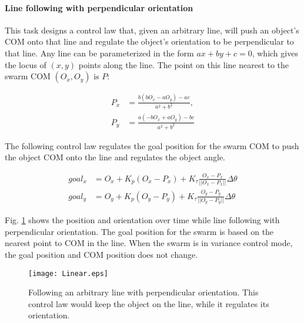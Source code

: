 \paragraph{Line following with perpendicular orientation} \label{para:PureTranslation}
This task designs a control law that, given an arbitrary line, will push an object's COM onto that line and regulate the object's orientation to be perpendicular to that line.
Any line can be parameterized in the form $ax+by+c =0$,  which gives the locus of $(x,y)$ points along the line.  The point on this line nearest to the swarm COM $(O_x,O_y)$ is $P$:


\begin{align}
P_x &= \frac{b(bO_x-aO_y)-ac}{a^2 + b^2},\\ \nonumber
P_y &= \frac{a(-bO_x+aO_y)-bc}{a^2 + b^2}
\end{align}


The following control law regulates the goal position for the swarm COM to push the object COM onto the line and regulates the object angle.

\begin{align}
goal_x &= O_x+ K_p (O_x-P_x)+ K_\tau \frac{O_x-P_x}{||O_x-P_x||}\Delta\theta \nonumber \\
goal_y &= O_y+ K_p (O_y-P_y)+ K_\tau \frac{O_y-P_y}{||O_y-P_y||}\Delta\theta \label{eq:Regulate}
\end{align}

Fig. \ref{fig:Linear} shows the position and orientation over time 
while line following with perpendicular orientation.
The goal position for the swarm is based on the nearest point to COM in the line.
 When the swarm is in variance control mode, the goal position and COM position does not change. 

\begin{figure}
\begin{center}
	\texttt{[image: Linear.eps]}
\end{center}
\vspace{-2em}
\caption{\label{fig:Linear} 
Following an arbitrary line with perpendicular orientation. This control law would keep the object on the line, while it regulates its orientation.
}
\vspace{-1em}
\end{figure}

